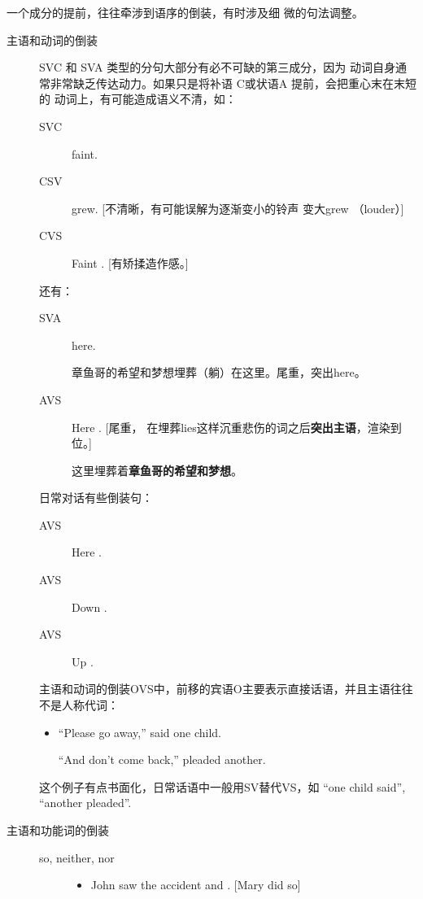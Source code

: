  一个成分的提前，往往牵涉到语序的倒装，有时涉及细
微的句法调整。
\begin{description}
\item[主语和动词的倒装] SVC 和 SVA 类型的分句大部分有必不可缺的第三成分，因为
  动词自身通常非常缺乏传达动力。如果只是将补语 C或状语A 提前，会把重心末在末短的
  动词上，有可能造成语义不清，如：
  \begin{description}
  \item[SVC]   faint.
  \item[CSV]   grew. [不清晰，有可能误解为逐渐变小的铃声
    变大grew （louder）]
  \item[CVS] Faint  . [有矫揉造作感。]
  \end{description}
  还有：
  \begin{description}
  \item[SVA]   here.

    章鱼哥的希望和梦想埋葬（躺）在这里。尾重，突出here。

  \item[AVS] Here  . [尾重，
    在埋葬lies这样沉重悲伤的词之后\textbf{突出主语}，渲染到位。]

    这里埋葬着\textbf{章鱼哥的希望和梦想}。
  \end{description}
  日常对话有些倒装句：
  \begin{description}
  \item[AVS] Here  .

  \item[AVS] Down  .
  \item[AVS] Up  .
  \end{description}

  主语和动词的倒装OVS中，前移的宾语O主要表示直接话语，并且主语往往不是人称代词：
  \begin{itemize}
  \item ``Please go away,'' said one child.

    ``And don't come back,'' pleaded another.
  \end{itemize}
  这个例子有点书面化，日常话语中一般用SV替代VS，如 ``one child said'',
  ``another pleaded''.

\item[主语和功能词的倒装]
  \begin{description}
  \item[so, neither, nor]
    \begin{itemize}
    \item John saw the accident and . [Mary did so]


\end{itemize}
\end{description}
\end{description}
